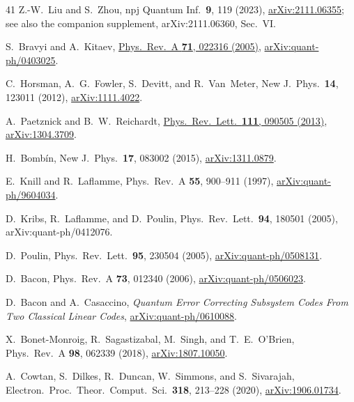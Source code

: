 \documentclass[aps,prl,reprint,notitlepage,nofootinbib,nobibnotes]{revtex4-2}
\begin{document}
\begin{thebibliography}{41}
Z.-W.~Liu and S.~Zhou,
npj Quantum Inf.\ \textbf{9}, 119 (2023),
\href{https://arxiv.org/abs/2111.06355}{arXiv:2111.06355};
see also the companion supplement, arXiv:2111.06360, Sec.~VI.

S.~Bravyi and A.~Kitaev,
\href{https://link.aps.org/doi/10.1103/PhysRevA.71.022316}{Phys.\ Rev.\ A \textbf{71}, 022316 (2005)},
\href{https://arxiv.org/abs/quant-ph/0403025}{arXiv:quant-ph/0403025}.

C.~Horsman, A.~G.~Fowler, S.~Devitt, and R.~Van~Meter,
New J.\ Phys.\ \textbf{14}, 123011 (2012),
\href{https://arxiv.org/abs/1111.4022}{arXiv:1111.4022}.

A.~Paetznick and B.~W.~Reichardt,
\href{https://link.aps.org/doi/10.1103/PhysRevLett.111.090505}{Phys.\ Rev.\ Lett.\ \textbf{111}, 090505 (2013)},
\href{https://arxiv.org/abs/1304.3709}{arXiv:1304.3709}.

H.~Bomb\'in,
New J.\ Phys.\ \textbf{17}, 083002 (2015),
\href{https://arxiv.org/abs/1311.0879}{arXiv:1311.0879}.

E.~Knill and R.~Laflamme,
Phys.\ Rev.\ A \textbf{55}, 900--911 (1997),
\href{https://arxiv.org/abs/quant-ph/9604034}{arXiv:quant-ph/9604034}.

D.~Kribs, R.~Laflamme, and D.~Poulin,
Phys.\ Rev.\ Lett.\ \textbf{94}, 180501 (2005),
arXiv:quant-ph/0412076.

D.~Poulin,
Phys.\ Rev.\ Lett.\ \textbf{95}, 230504 (2005),
\href{https://arxiv.org/abs/quant-ph/0508131}{arXiv:quant-ph/0508131}.

D.~Bacon,
Phys.\ Rev.\ A \textbf{73}, 012340 (2006),
\href{https://arxiv.org/abs/quant-ph/0506023}{arXiv:quant-ph/0506023}.

D.~Bacon and A.~Casaccino,
\emph{Quantum Error Correcting Subsystem Codes From Two Classical Linear Codes},
\href{https://arxiv.org/abs/quant-ph/0610088}{arXiv:quant-ph/0610088}.

X.~Bonet-Monroig, R.~Sagastizabal, M.~Singh, and T.~E.~O'Brien,
Phys.\ Rev.\ A \textbf{98}, 062339 (2018),
\href{https://arxiv.org/abs/1807.10050}{arXiv:1807.10050}.

A.~Cowtan, S.~Dilkes, R.~Duncan, W.~Simmons, and S.~Sivarajah,
Electron.\ Proc.\ Theor.\ Comput.\ Sci.\ \textbf{318}, 213--228 (2020),
\href{https://arxiv.org/abs/1906.01734}{arXiv:1906.01734}.


\end{thebibliography}
\end{document}

